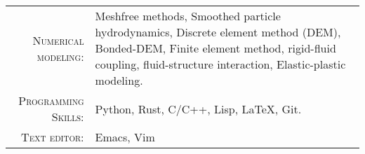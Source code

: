 %
%



\renewcommand{\arraystretch}{1.1}

    \begin{tabular}{>{}r>{}p{13cm}}
      \textsc{Numerical modeling:} & Meshfree methods, Smoothed particle hydrodynamics,
                                     Discrete element method (DEM), Bonded-DEM,
                                     Finite element method, rigid-fluid coupling,
                                     fluid-structure interaction,
                                     Elastic-plastic modeling.\\

      \textsc{Programming Skills:}    &  Python, Rust, C/C++, Lisp, \LaTeX, Git.\\

      \textsc{Text editor:}    &  Emacs, Vim
    \end{tabular}
